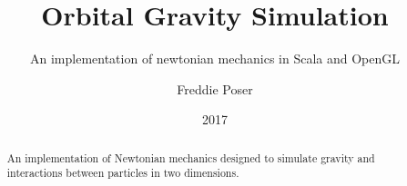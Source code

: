 \documentclass[]{scrartcl}
\title{Orbital Gravity Simulation}
\subtitle{An implementation of newtonian mechanics in Scala and OpenGL}
\author{Freddie Poser}
\date{2017}
\begin{document}
\maketitle

\begin{abstract}
An implementation of Newtonian mechanics designed to simulate gravity and interactions between particles in two dimensions.
\end{abstract}

\tableofcontents
\listoffigures
\newpage


\newpage

\newpage

\newpage

\newpage

\newpage

\newpage

\newpage

\end{document}
